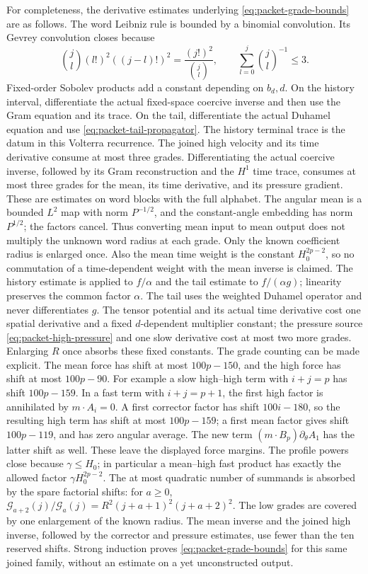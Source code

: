 For completeness, the derivative estimates underlying
\eqref{eq:packet-grade-bounds} are as follows. The word Leibniz rule is
bounded by a binomial convolution. Its Gevrey convolution closes because
\[
 \binom jl(l!)^2((j-l)!)^2
       =\frac{(j!)^2}{\binom jl},
 \qquad \sum_{l=0}^j {\binom{j}{l}}^{-1}\le3.
\]
Fixed-order Sobolev products add a constant depending on $b_d,d$.
On the history interval, differentiate the actual fixed-space coercive
inverse and then use the Gram equation and its trace. On the tail,
differentiate the actual Duhamel equation and use
\eqref{eq:packet-tail-propagator}. The history terminal trace is the
datum in this Volterra recurrence. The joined high velocity and its time
derivative consume at most three grades. Differentiating the actual coercive
inverse, followed by its Gram reconstruction and the $H^1$ time trace,
consumes at most three grades for the mean, its time derivative, and its
pressure gradient. These are estimates on word blocks with the full
alphabet. The angular mean is a bounded $L^2$ map with norm $P^{-1/2}$,
and the constant-angle embedding has norm $P^{1/2}$; the factors cancel.
Thus converting mean input to mean output does not multiply the unknown
word radius at each grade. Only the known coefficient radius is enlarged
once. Also the mean time weight is the constant $H_0^{2p-2}$, so no
commutation of a time-dependent weight with the mean inverse is claimed.
The history estimate is applied to $f/\alpha$ and the tail estimate
to $f/(\alpha g)$; linearity preserves the common factor $\alpha$.
The tail uses the weighted Duhamel operator and never differentiates $g$. The tensor potential and its actual time derivative cost one spatial
derivative and a fixed $d$-dependent multiplier constant; the pressure
source \eqref{eq:packet-high-pressure} and one slow derivative cost at
most two more grades. Enlarging $R$ once absorbs these fixed constants.
The grade counting can be made explicit. The mean force has shift at
most $100p-150$, and the high force has shift at most $100p-90$.
For example a slow high--high term with $i+j=p$ has shift
$100p-159$. In a fast term with $i+j=p+1$, the first high factor is
annihilated by $m\cdot A_i=0$. A first corrector factor has shift
$100i-180$, so the resulting high term has shift at most $100p-159$;
a first mean factor gives shift $100p-119$, and has zero angular average.
The new term $(m\cdot B_p)\partial_\theta A_1$ has the latter shift as
well. These leave the displayed force margins. The profile powers close
because $\gamma\le H_0$; in particular a mean--high fast product has
exactly the allowed factor $\gamma H_0^{2p-2}$.
The at most quadratic number of summands is absorbed by the spare
factorial shifts: for $a\ge0$,
$\mathcal G_{a+2}(j)/\mathcal G_a(j)
 =R^2(j+a+1)^2(j+a+2)^2$.
The low grades are covered by one enlargement of the known radius.
The mean inverse and the joined high inverse, followed by the corrector
and pressure estimates, use fewer than the ten reserved shifts.
Strong induction proves \eqref{eq:packet-grade-bounds} for this same
joined family, without an estimate on a yet unconstructed output.

